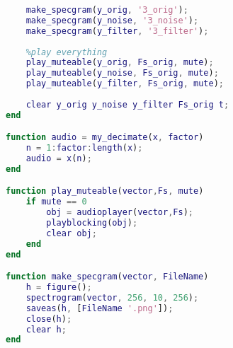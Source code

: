 \documentclass[11pt, a4paper]{article}
\begin{document}
\begin{lstlisting}[language=matlab, frame=single]
    %draw specgrams
    make_specgram(y_orig, '3_orig');
    make_specgram(y_noise, '3_noise');
    make_specgram(y_filter, '3_filter');
    
    %play everything
    play_muteable(y_orig, Fs_orig, mute);
    play_muteable(y_noise, Fs_orig, mute);
    play_muteable(y_filter, Fs_orig, mute);
    
    clear y_orig y_noise y_filter Fs_orig t;
end

function audio = my_decimate(x, factor)
    n = 1:factor:length(x);
    audio = x(n);
end

function play_muteable(vector,Fs, mute)
    if mute == 0
        obj = audioplayer(vector,Fs);
        playblocking(obj);
        clear obj;
    end
end

function make_specgram(vector, FileName)
    h = figure();
    spectrogram(vector, 256, 10, 256);
    saveas(h, [FileName '.png']);
    close(h);
    clear h;
end
\end{lstlisting}
\end{document}

